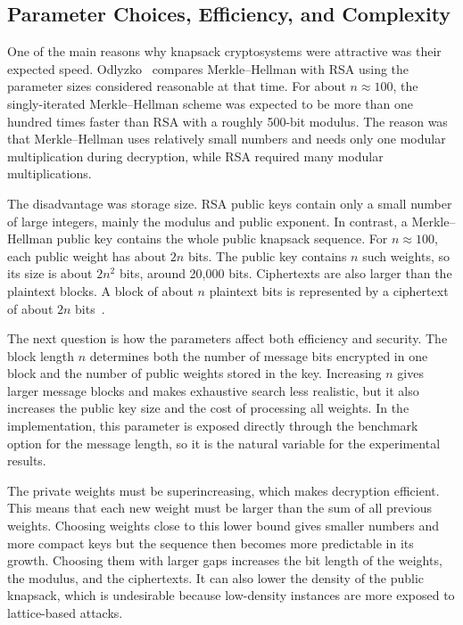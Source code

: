 \subsection{Parameter Choices, Efficiency, and Complexity}

One of the main reasons why knapsack cryptosystems were attractive was their
expected speed. Odlyzko~\cite{OdlyzkoRiseFall} compares Merkle--Hellman with
RSA using the parameter sizes considered reasonable at that time. For about $n
\approx 100$, the singly-iterated Merkle--Hellman scheme was expected to be
more than one hundred times faster than RSA with a roughly 500-bit modulus. The
reason was that Merkle--Hellman uses relatively small numbers and needs only
one modular multiplication during decryption, while RSA required many modular
multiplications. 

The disadvantage was storage size. RSA public keys contain only a small number
of large integers, mainly the modulus and public exponent. In contrast, a
Merkle--Hellman public key contains the whole public knapsack sequence. For $n
\approx 100$, each public weight has about $2n$ bits. The public key contains
$n$ such weights, so its size is about $2n^2$ bits, around 20,000 bits.
Ciphertexts are also larger than the plaintext blocks. A block of about $n$
plaintext bits is represented by a ciphertext of about $2n$
bits~\cite{OdlyzkoRiseFall}.

The next question is how the parameters affect both efficiency and security.
The block length $n$ determines both the number of message bits encrypted in
one block and the number of public weights stored in the key. Increasing $n$
gives larger message blocks and makes exhaustive search less realistic, but it
also increases the public key size and the cost of processing all weights. In
the implementation, this parameter is exposed directly through the benchmark
option for the message length, so it is the natural variable for the
experimental results.

The private weights must be superincreasing, which makes decryption efficient.
This means that each new weight must be larger than the sum of all previous
weights. Choosing weights close to this lower bound gives smaller numbers and
more compact keys but the sequence then becomes more predictable in its
growth. Choosing them with larger gaps increases the bit length of the
weights, the modulus, and the ciphertexts. It can also lower the density of the
public knapsack, which is undesirable because low-density instances are more
exposed to lattice-based attacks.

